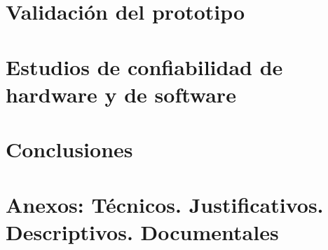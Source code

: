 \documentclass[12pt]{article}
\begin{document}
  \section{Validación del prototipo}  

    

  \newpage


  \section{Estudios de confiabilidad de hardware y de software}  
  
  
  
  \newpage



  \section{Conclusiones}  

    

  \newpage



  \section{Anexos: Técnicos. Justificativos. Descriptivos. Documentales}  

    

  \newpage







  \newpage

  \begin{thebibliography}{1}
    \bibitem{} 

  \end{thebibliography}
    
\end{document}
